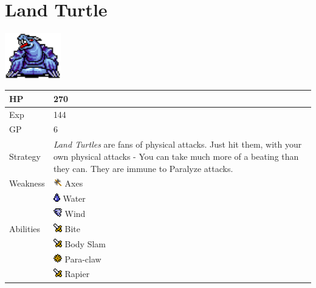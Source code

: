 \section{Land Turtle}
\label{monster:land_turtle}

\includegraphics[height=2cm,keepaspectratio]{./resources/monster/land_turtle}

\begin{longtable}{ l p{9cm} }
	HP
	& 270
\\ \hline
	Exp
	& 144
\\ \hline
	GP
	& 6
\\ \hline
	Strategy
	& \textit{Land Turtles} are fans of physical attacks. Just hit them, with your own physical attacks - You can take much more of a beating than they can. They are immune to Paralyze attacks.
\\ \hline
	Weakness
	& \includegraphics[height=1em,keepaspectratio]{./resources/effects/axe} Axes \\
	& \includegraphics[height=1em,keepaspectratio]{./resources/effects/water} Water \\
	& \includegraphics[height=1em,keepaspectratio]{./resources/effects/wind} Wind
\\ \hline
	Abilities
	& \includegraphics[height=1em,keepaspectratio]{./resources/effects/damage} Bite \\
	& \includegraphics[height=1em,keepaspectratio]{./resources/effects/damage} Body Slam \\
	& \includegraphics[height=1em,keepaspectratio]{./resources/effects/paralyze} Para-claw \\
	& \includegraphics[height=1em,keepaspectratio]{./resources/effects/damage} Rapier
\end{longtable}
